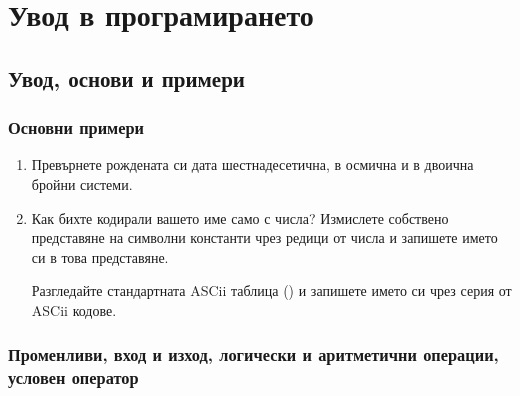 \chapter{Увод в програмирането}
\section {Увод, основи и примери}

\subsection {Основни примери}

\begin{enumerate}

	\item Превърнете рождената си дата шестнадесетична, в осмична и в двоична бройни системи.

	\item Как бихте кодирали вашето име само с числа? Измислете собствено представяне на символни константи чрез редици от числа и запишете името си в това представяне.

	Разгледайте стандартната ASCii таблица () и запишете името си чрез серия от ASCii кодове.

\end{enumerate}

\subsection {Променливи, вход и изход, логически и аритметични операции, условен оператор}

